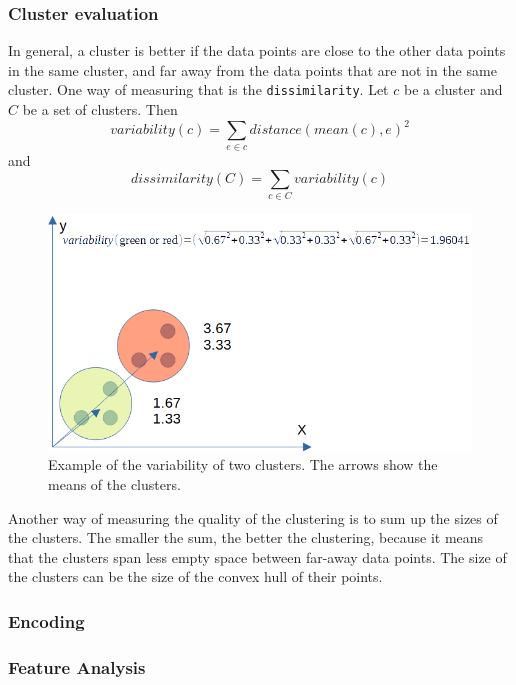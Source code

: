 \documentclass[10pt,a4paper]{article}
\begin{document}
\subsubsection{Cluster evaluation}
\label{subsubsec:clusterEvaluation}
In general, a cluster is better if the data points are close to the other data points in the same cluster, and far away from the data points that are not in the same cluster. One way of measuring that is the \texttt{dissimilarity}. Let $c$ be a cluster and $C$ be a set of clusters. Then
\begin{equation}
    variability(c) = \sum_{e\in c}distance(mean(c),e)^2
\end{equation}
and
\begin{equation}
    dissimilarity(C) = \sum_{c\in C}{variability(c)}
\end{equation}\cite{MIT:ComputationalThinking}
\begin{figure}[htbp]
    \centering
    \includegraphics[scale=0.9]{Variability.png}
    \caption{Example of the variability of two clusters. The arrows show the means of the clusters.}
    \label{fig:clusterEvaluation}
\end{figure}


Another way of measuring the quality of the clustering is to sum up the sizes of the clusters. The smaller the sum, the better the clustering, because it means that the clusters span less empty space between far-away data points. The size of the clusters can be the size of the convex hull of their points.
\subsubsection{Encoding}
\subsubsection{Feature Analysis}
\end{document}
